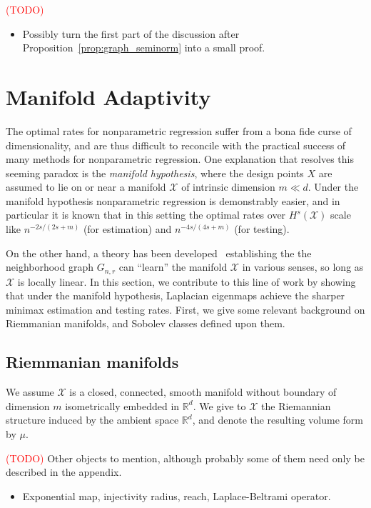 \documentclass{article}
\newcommand{\Reals}{\mathbb{R}}
\newcommand{\1}{\mathbf{1}}
\newcommand{\Rd}{\Reals^d}
\newcommand{\Xset}{\mathcal{X}}
\newcommand{\mc}[1]{\mathcal{#1}}
\theoremstyle{alden}
\theoremstyle{aldenthm}
\theoremstyle{definition}
\theoremstyle{remark}
\begin{document}
\textcolor{red}{(TODO)}
\begin{itemize}
	\item Possibly turn the first part of the discussion after Proposition~\ref{prop:graph_seminorm} into a small proof.
\end{itemize}


\section{Manifold Adaptivity}
\label{sec:manifold_adaptivity}

The optimal rates for nonparametric regression suffer from a bona fide curse of dimensionality, and are thus difficult to reconcile with the practical success of many methods for nonparametric regression. One explanation that resolves this seeming paradox is the \emph{manifold hypothesis}, where the design points $X$ are assumed to lie on or near a manifold $\mc{X}$ of intrinsic dimension $m \ll d$. Under the manifold hypothesis nonparametric regression is demonstrably easier, and in particular it is known \citep{bickel2007,ariascastro2018} that in this setting the optimal rates over $H^s(\Xset)$ scale like $n^{-2s/(2s + m)}$ (for estimation) and $n^{-4s/(4s + m)}$ (for testing). 

On the other hand, a theory has been developed~\citep{belkin03,belkin05,niyogi2013} establishing the the neighborhood graph $G_{n,r}$ can ``learn'' the manifold $\Xset$ in various senses, so long as $\Xset$ is locally linear. In this section, we contribute to this line of work by showing that under the manifold hypothesis, Laplacian eigenmaps achieve the sharper minimax estimation and testing rates. First, we give some relevant background on Riemmanian manifolds, and Sobolev classes defined upon them.

\subsection{Riemmanian manifolds}
We assume $\mc{X}$ is a closed, connected, smooth manifold without boundary of dimension $m$ isometrically embedded in $\Rd$. We give to $\mc{X}$ the Riemannian structure induced by the ambient space $\Rd$, and denote the resulting volume form by $\mu$.

\textcolor{red}{(TODO)} Other objects to mention, although probably some of them need only be described in the appendix.
\begin{itemize}
	\item Exponential map, injectivity radius, reach, Laplace-Beltrami operator.
\end{itemize}
\end{document}
